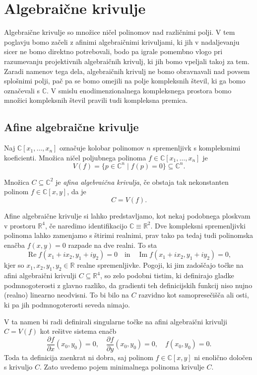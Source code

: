 \documentclass[mat1]{fmfdelo}
\numberwithin{equation}{section}
\newcommand{\R}{\mathbb R}
\newcommand{\C}{\mathbb C}
\newcommand{\pdv}[2][]{\frac{\partial#1}{\partial#2}}
\renewcommand\Re{\operatorname{Re}}%
\renewcommand\Im{\operatorname{Im}}%
\theoremstyle{definition}
\begin{document}
\section{Algebraične krivulje} \label{algebraicne krivulje}
Algebraične krivulje so množice ničel polinomov nad različnimi polji. V tem poglavju bomo začeli 
z afinimi
algebraičnimi krivuljami, ki jih v nadaljevanju sicer ne bomo direktno potrebovali, bodo pa igrale pomembno
vlogo pri razumevanju projektivnih algebraičnih krivulj, ki jih bomo vpeljali takoj za tem. 
Zaradi namenov tega dela, algebraičnih krivulj ne bomo obravnavali nad povsem splošnimi polji, pač pa se
bomo omejili na polje kompleksnih števil, ki ga bomo označevali s $\C$. V smislu enodimenzionalnega kompleksnega prostora bomo množici kompleksnih števil pravili tudi kompleksna premica.


\subsection{Afine algebraične krivulje} 
Naj $\C[x_1, \dots, x_n]$ označuje kolobar polinomov $n$ spremenljivk s
kompleksnimi koeficienti. Množica ničel poljubnega polinoma $f \in \C[x_1, \dots, x_n]$ je
\[
    V(f) = \{p \in \C^n \mid f(p) = 0 \} \subseteq \C^n.
\] 

\begin{definicija}
    Množica $C \subseteq \C^2$ je \emph{afina algebraična krivulja}, če obstaja tak nekonstanten polinom $f \in \C[x,y]$, da je
    \[
        C = V(f).
    \]
\end{definicija}

Afine algebraične krivulje si lahko predstavljamo, kot nekaj podobnega ploskvam v prostoru $\R^4$, če naredimo identifikacijo $\C \equiv \R^2$. Dve kompleksni spremenljivki polinoma lahko zamenjamo s štirimi realnimi, prav tako pa tedaj tudi polinomska enačba $f(x,y) = 0$ razpade na dve realni. To sta
\[
    \Re f(x_1 + ix_2, y_1 + iy_2) = 0 \quad \text{in} \quad \Im f(x_1 + ix_2, y_1 + iy_2) = 0,
\]
kjer so $x_1, x_2, y_1, y_2 \in \R$ realne spremenljivke.
Pogoji, ki jim zadoščajo točke na afini algebraični krivulji $C \subseteq \R^4$, so zelo podobni tistim, ki definirajo gladke pod\-mnogoterosti z glavno razliko, da gradienti teh definicijskih funkcij niso nujno (realno) linearno neodvisni. To bi bilo na $C$ razvidno kot samopresečišča ali osti, ki pa jih podmnogoterosti seveda nimajo. 
\par
V ta namen bi radi definirali singularne točke na afini algebraični krivulji $C = V(f)$ kot rešitve sistema enačb 
\[ 
    \pdv[f]{x}(x_0, y_0) = 0, \quad \pdv[f]{y}(x_0, y_0) = 0, \quad f(x_0, y_0) = 0.
\]
Toda ta definicija zaenkrat ni dobra, saj polinom $f \in \C[x,y]$ ni enolično določen s krivuljo $C$. 
Zato uvedemo pojem minimalnega polinoma krivulje $C$.
\end{document}
